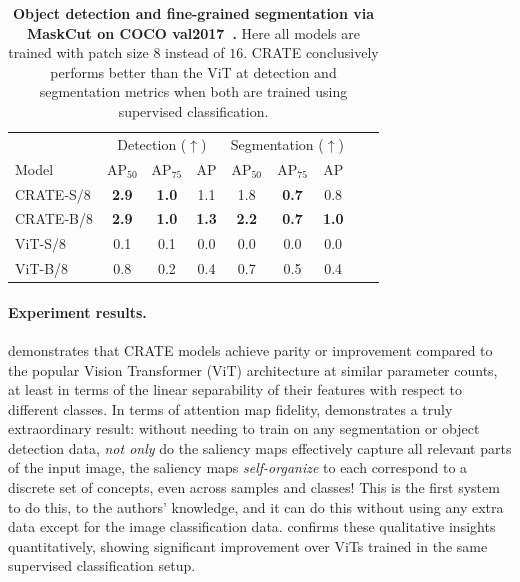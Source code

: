 \documentclass[../../book-main.tex]{subfiles}
\begin{document}
\begin{table}[t]
\caption{\small\textbf{Object detection and fine-grained
    segmentation via MaskCut on COCO val2017~\citep{lin2014microsoft}.}
Here all models are trained with patch size \(8\) instead of \(16\).
CRATE conclusively performs better than the ViT at detection and
segmentation metrics when both are trained using supervised classification.}
\centering
\begin{tabular}{@{}lcccccccc@{}}
    \toprule
    &  \multicolumn{3}{c}{Detection (\(\uparrow\))} &
    \multicolumn{3}{c}{Segmentation (\(\uparrow\))} \\
    Model & AP\(_{50}\) & AP\(_{75}\) & AP & AP\(_{50}\) & AP\(_{75}\) & AP  \\
    \midrule
    CRATE-S/8 & \textbf{2.9} & \textbf{1.0} & 1.1 & 1.8 & \textbf{0.7} & 0.8 \\
    CRATE-B/8 & \textbf{2.9} & \textbf{1.0} & \textbf{1.3} &
    \textbf{2.2} & \textbf{0.7} & \textbf{1.0} \\
    ViT-S/8 & 
    0.1& 0.1 & 0.0 & 0.0 & 0.0 & 0.0 \\
    ViT-B/8 & 0.8 & 0.2 & 0.4 & 0.7 & 0.5 & 0.4 \\
    \bottomrule
\end{tabular}
\label{tab:crate_detection_segmentation}
\end{table}

\paragraph{Experiment results.}

 demonstrates that
CRATE models achieve parity or improvement compared to the popular
Vision Transformer (ViT) architecture at similar parameter counts, at
least in terms of the linear separability of their features with
respect to different classes. In terms of attention map fidelity,
 demonstrates a truly extraordinary
result: without needing to train on any segmentation or object
detection data, \textit{not only} do the saliency maps effectively
capture all relevant parts of the input image, the saliency maps
\textit{self-organize} to each correspond to a discrete set of
concepts, even across samples and classes! This is the first system
to do this, to the authors' knowledge, and it can do this without
using any extra data except for the image classification data.
 confirms these qualitative
insights quantitatively, showing significant improvement over ViTs
trained in the same supervised classification setup.
\end{document}
